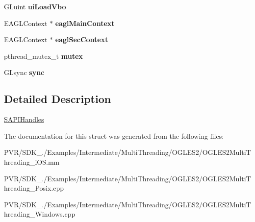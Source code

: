 \begin{DoxyCompactItemize}
\item 
\hypertarget{struct_s_a_p_i_handles_a05c3f3580fdb9d316b3e29e109f57349}{G\+Luint {\bfseries ui\+Load\+Vbo}}\label{struct_s_a_p_i_handles_a05c3f3580fdb9d316b3e29e109f57349}

\item 
\hypertarget{struct_s_a_p_i_handles_a29f33af5d055d028e8127699b80b80ff}{E\+A\+G\+L\+Context $\ast$ {\bfseries eagl\+Main\+Context}}\label{struct_s_a_p_i_handles_a29f33af5d055d028e8127699b80b80ff}

\item 
\hypertarget{struct_s_a_p_i_handles_a2450a672e6482e7ecf435401de2af223}{E\+A\+G\+L\+Context $\ast$ {\bfseries eagl\+Sec\+Context}}\label{struct_s_a_p_i_handles_a2450a672e6482e7ecf435401de2af223}

\item 
\hypertarget{struct_s_a_p_i_handles_a26efb33ece5c168e1e7929b7f43964ed}{pthread\+\_\+mutex\+\_\+t {\bfseries mutex}}\label{struct_s_a_p_i_handles_a26efb33ece5c168e1e7929b7f43964ed}

\item 
\hypertarget{struct_s_a_p_i_handles_a67ee30a38dc010329e4b0d17e74c6f58}{G\+Lsync {\bfseries sync}}\label{struct_s_a_p_i_handles_a67ee30a38dc010329e4b0d17e74c6f58}

\end{DoxyCompactItemize}


\subsection{Detailed Description}


  \hyperlink{struct_s_a_p_i_handles}{S\+A\+P\+I\+Handles} 

The documentation for this struct was generated from the following files\+:\begin{DoxyCompactItemize}
\item 
P\+V\+R/\+S\+D\+K\+\_./\+Examples/\+Intermediate/\+Multi\+Threading/\+O\+G\+L\+E\+S2/O\+G\+L\+E\+S2\+Multi\+Threading\+\_\+i\+O\+S.\+mm\item 
P\+V\+R/\+S\+D\+K\+\_./\+Examples/\+Intermediate/\+Multi\+Threading/\+O\+G\+L\+E\+S2/O\+G\+L\+E\+S2\+Multi\+Threading\+\_\+\+Posix.\+cpp\item 
P\+V\+R/\+S\+D\+K\+\_./\+Examples/\+Intermediate/\+Multi\+Threading/\+O\+G\+L\+E\+S2/O\+G\+L\+E\+S2\+Multi\+Threading\+\_\+\+Windows.\+cpp\end{DoxyCompactItemize}
